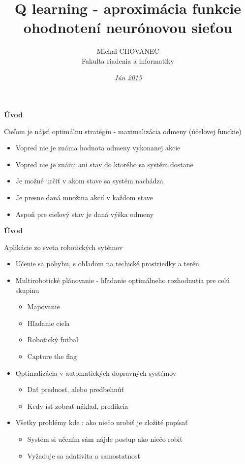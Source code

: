 \documentclass[xcolor=dvipsnames]{beamer}
\title{\bf Q learning - aproximácia funkcie ohodnotení neurónovou sieťou}
\author{Michal CHOVANEC \\Fakulta riadenia a informatiky}
\date[EURP]{\it Jún 2015}
\begin{document}
\begin{frame}
\titlepage
\end{frame}

\begin{frame}{\bf Úvod}

Cieľom je nájsť optimálnu stratégiu - maximalizácia odmeny (účelovej funckie)

\begin{itemize}
\item{Vopred nie je známa hodnota odmeny vykonanej akcie}
\item{Vopred nie je známi ani stav do ktorého sa systém dostane}
\item{Je možné určiť v akom stave sa systém nachádza}
\item{Je presne daná množina akcií v každom stave}
\item{Aspoň pre cieľový stav je daná výška odmeny}
\end{itemize}

\end{frame}

\begin{frame}{\bf Úvod}

Aplikácie zo sveta robotických sytémov

\begin{itemize}
\item{Učenie sa pohybu, s ohľadom na techické prostriedky a terén}
\item{Multirobotické plánovanie - hľadanie optimálneho rozhodnutia pre celú skupinu}
    \begin{itemize}
    \item{Mapovanie}
    \item{Hľadanie cieľa}
    \item{Robotický futbal}
    \item{Capture the flag}
    \end{itemize}
\item{Optimalizácia v automatických dopravných systémov}
    \begin{itemize}
    \item{Dať prednosť, alebo predbehnúť}
    \item{Kedy ísť zobrať náklad, predikcia}
    \end{itemize}
\item{Všetky problémy kde : ako niečo urobiť je zložité popísať}
    \begin{itemize}
    \item{Systém si učením sám nájde postup ako niečo robiť}
    \item{Vyžaduje sa adativita a samostatnosť}
    \end{itemize}
\end{itemize}

\end{frame}
\end{document}
